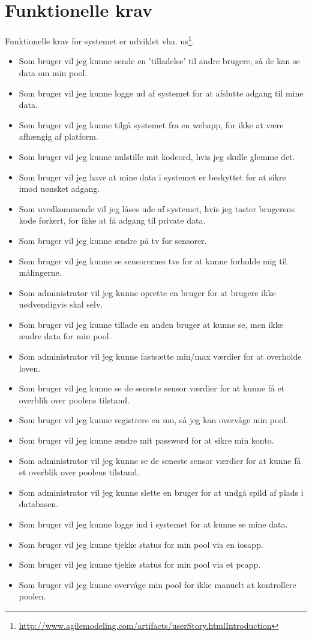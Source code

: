 \section{Funktionelle krav}
Funktionelle krav for systemet er udviklet vha. \gls{us}\footnote{\url{http://www.agilemodeling.com/artifacts/userStory.htmlIntroduction}}.

\begin{itemize}
	\item Som bruger vil jeg kunne sende en ’tilladelse’ til andre brugere, så de kan se data om min pool.
	\item Som bruger vil jeg kunne logge ud af systemet for at afslutte adgang til mine data.
	\item Som bruger vil jeg kunne tilgå systemet fra en \gls{webapp}, for ikke at være afhængig af platform.
	\item Som bruger vil jeg kunne nulstille mit kodeord, hvis jeg skulle glemme det.
	\item Som bruger vil jeg have at mine data i systemet er beskyttet for at sikre imod uønsket adgang.
	\item Som uvedkommende vil jeg låses ude af systemet, hvis jeg taster brugerens kode forkert, for ikke at få adgang til private data.
	\item Som bruger vil jeg kunne ændre på \gls{tv} for sensorer.
	\item Som bruger vil jeg kunne se sensorernes \glspl{tv} for at kunne forholde mig til målingerne.
	\item Som administrator vil jeg kunne oprette en bruger for at brugere ikke nødvendigvis skal selv.
	\item Som bruger vil jeg kunne tillade en anden bruger at kunne se, men ikke ændre data for min pool.
	\item Som administrator vil jeg kunne fastsætte min/max værdier for at overholde loven.
	\item Som bruger vil jeg kunne se de seneste sensor værdier for at kunne få et overblik over poolens tilstand.
	\item Som bruger vil jeg kunne registrere en \gls{mu}, så jeg kan overvåge min pool.
	\item Som bruger vil jeg kunne ændre mit password for at sikre min konto.
	\item Som administrator vil jeg kunne se de seneste sensor værdier for at kunne få et overblik over poolens tilstand.
	\item Som administrator vil jeg kunne slette en bruger for at undgå spild af plads i databasen.
	\item Som bruger vil jeg kunne logge ind i systemet for at kunne se mine data.
	\item Som bruger vil jeg kunne tjekke status for min pool via en \gls{iosapp}.
	\item Som bruger vil jeg kunne tjekke status for min pool via et \gls{pcapp}.
	\item Som bruger vil jeg kunne overvåge min pool for ikke manuelt at kontrollere poolen.
\end{itemize}

\newpage